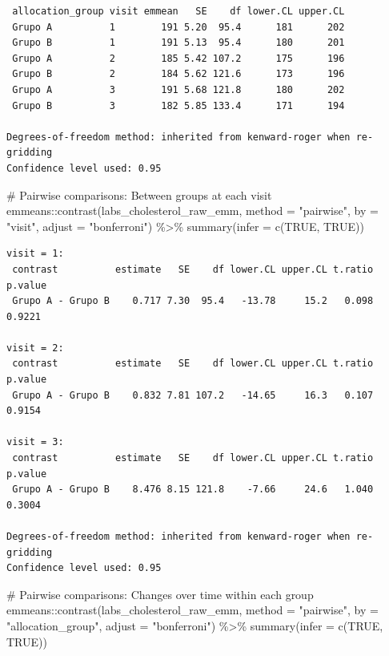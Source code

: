 \documentclass[
  letterpaper,
  DIV=11,
  numbers=noendperiod]{scrartcl}
\newenvironment{Shaded}{\begin{snugshade}}{\end{snugshade}}
\newcommand{\AttributeTok}[1]{\textcolor[rgb]{0.40,0.45,0.13}{#1}}
\newcommand{\CommentTok}[1]{\textcolor[rgb]{0.37,0.37,0.37}{#1}}
\newcommand{\ConstantTok}[1]{\textcolor[rgb]{0.56,0.35,0.01}{#1}}
\newcommand{\FunctionTok}[1]{\textcolor[rgb]{0.28,0.35,0.67}{#1}}
\newcommand{\NormalTok}[1]{\textcolor[rgb]{0.00,0.23,0.31}{#1}}
\newcommand{\SpecialCharTok}[1]{\textcolor[rgb]{0.37,0.37,0.37}{#1}}
\newcommand{\StringTok}[1]{\textcolor[rgb]{0.13,0.47,0.30}{#1}}
\begin{document}
\begin{verbatim}
 allocation_group visit emmean   SE    df lower.CL upper.CL
 Grupo A          1        191 5.20  95.4      181      202
 Grupo B          1        191 5.13  95.4      180      201
 Grupo A          2        185 5.42 107.2      175      196
 Grupo B          2        184 5.62 121.6      173      196
 Grupo A          3        191 5.68 121.8      180      202
 Grupo B          3        182 5.85 133.4      171      194

Degrees-of-freedom method: inherited from kenward-roger when re-gridding 
Confidence level used: 0.95 
\end{verbatim}

\begin{Shaded}
\begin{Highlighting}[]
\CommentTok{\# Pairwise comparisons: Between groups at each visit}
\NormalTok{emmeans}\SpecialCharTok{::}\FunctionTok{contrast}\NormalTok{(labs\_cholesterol\_raw\_emm, }\AttributeTok{method =} \StringTok{"pairwise"}\NormalTok{, }\AttributeTok{by =} \StringTok{"visit"}\NormalTok{, }\AttributeTok{adjust =} \StringTok{"bonferroni"}\NormalTok{) }\SpecialCharTok{\%\textgreater{}\%} \FunctionTok{summary}\NormalTok{(}\AttributeTok{infer =} \FunctionTok{c}\NormalTok{(}\ConstantTok{TRUE}\NormalTok{, }\ConstantTok{TRUE}\NormalTok{))}
\end{Highlighting}
\end{Shaded}

\begin{verbatim}
visit = 1:
 contrast          estimate   SE    df lower.CL upper.CL t.ratio p.value
 Grupo A - Grupo B    0.717 7.30  95.4   -13.78     15.2   0.098  0.9221

visit = 2:
 contrast          estimate   SE    df lower.CL upper.CL t.ratio p.value
 Grupo A - Grupo B    0.832 7.81 107.2   -14.65     16.3   0.107  0.9154

visit = 3:
 contrast          estimate   SE    df lower.CL upper.CL t.ratio p.value
 Grupo A - Grupo B    8.476 8.15 121.8    -7.66     24.6   1.040  0.3004

Degrees-of-freedom method: inherited from kenward-roger when re-gridding 
Confidence level used: 0.95 
\end{verbatim}

\begin{Shaded}
\begin{Highlighting}[]
\CommentTok{\# Pairwise comparisons: Changes over time within each group}
\NormalTok{emmeans}\SpecialCharTok{::}\FunctionTok{contrast}\NormalTok{(labs\_cholesterol\_raw\_emm, }\AttributeTok{method =} \StringTok{"pairwise"}\NormalTok{, }\AttributeTok{by =} \StringTok{"allocation\_group"}\NormalTok{, }\AttributeTok{adjust =} \StringTok{"bonferroni"}\NormalTok{) }\SpecialCharTok{\%\textgreater{}\%} \FunctionTok{summary}\NormalTok{(}\AttributeTok{infer =} \FunctionTok{c}\NormalTok{(}\ConstantTok{TRUE}\NormalTok{, }\ConstantTok{TRUE}\NormalTok{))}
\end{Highlighting}
\end{Shaded}
\end{document}
